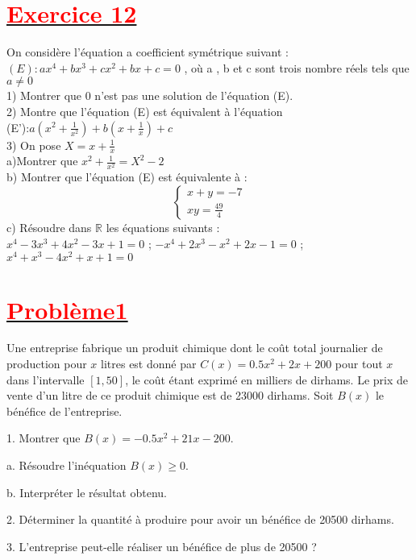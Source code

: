\documentclass[12pt]{article}
\begin{document}
\section*{\underline{\textbf{\textcolor{red}{Exercice 12}}}}
On considère l’équation a coefficient symétrique suivant :\\
$(E):ax^{4}+bx^{3}+cx^{2}+bx+c=0$ , où a , b et c sont trois nombre réels tels que $a \neq 0$\\
1) Montrer que 0 n’est pas une solution de l’équation (E).\\
2) Montre que l’équation (E) est équivalent à l’équation\\
(E'):$a(x^{2}+\frac{1}{x^{2}})+b(x+\frac{1}{x})+c$\\
3) On pose $X=x+\frac{1}{x}$\\
a)Montrer que $x^{2}+\frac{1}{x^{2}}=X^{2}-2$\\
b) Montrer que l’équation (E) est équivalente à :
\begin{equation*}
\begin{cases}
x + y = -7 \\
xy = \frac{49}{4}
\end{cases}
\end{equation*}
c) Résoudre dans $\mathbb{R}$ les équations suivants :\\
$x^{4}-3x^{3} + 4x^{2}-3x + 1 = 0$ ; $-x^{4} + 2x^{3} -x^{2} + 2x - 1 = 0$ ; 
$x^{4} + x^{3} - 4x^{2} + x + 1 = 0$ 
\section*{\underline{\textbf{\textcolor{red}{Problème1}}}}
Une entreprise fabrique un produit chimique dont le coût total journalier de production pour \( x \) litres est donné par \( C(x) = 0.5x^2 + 2x + 200 \) pour tout \( x \) dans l'intervalle \( [1, 50] \), le coût étant exprimé en milliers de dirhams. Le prix de vente d'un litre de ce produit chimique est de 23000 dirhams. Soit \( B(x) \) le bénéfice de l'entreprise.

1. Montrer que \( B(x) = -0.5x^2 + 21x - 200 \).

a. Résoudre l'inéquation \( B(x) \geq 0 \).

b. Interpréter le résultat obtenu.

2. Déterminer la quantité à produire pour avoir un bénéfice de 20500 dirhams.

3. L'entreprise peut-elle réaliser un bénéfice de plus de 20500 ?
\end{document}
